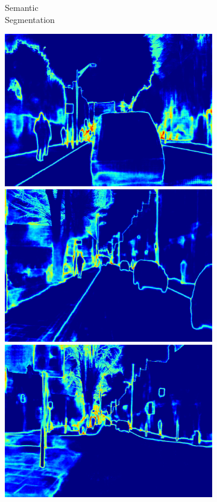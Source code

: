 \begin{figure}[t]
{\begin{subfigure}[t]{0.22\linewidth}
        \caption{Semantic\\Segmentation}
    \end{subfigure}
    \begin{subfigure}[t]{0.22\linewidth}
        \centering
		\includegraphics[width=\linewidth]{segnet_1_output_3.png}
        \vspace{1px}
		\includegraphics[width=\linewidth]{segnet_13_output_3.png}
        \vspace{1px}
        \includegraphics[width=\linewidth]{segnet_2_output_3.png}

\end{subfigure}}
\end{figure}
